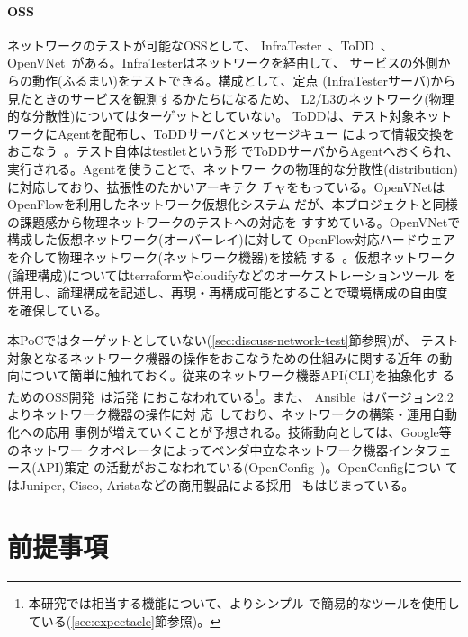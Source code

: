     \paragraph{OSS}
ネットワークのテストが可能なOSSとして、
InfraTester~\cite{infratester-github}、ToDD~\cite{todd-github}、
OpenVNet~\cite{openvnet-web}がある。InfraTesterはネットワークを経由して、
サービスの外側からの動作(ふるまい)をテストできる。構成として、定点
(InfraTesterサーバ)から見たときのサービスを観測するかたちになるため、
L2/L3のネットワーク(物理的な分散性)についてはターゲットとしていない。
ToDDは、テスト対象ネットワークにAgentを配布し、ToDDサーバとメッセージキュー
によって情報交換をおこなう~\cite{todd-blog}。テスト自体はtestletという形
でToDDサーバからAgentへおくられ、実行される。Agentを使うことで、ネットワー
クの物理的な分散性(distribution)に対応しており、拡張性のたかいアーキテク
チャをもっている。OpenVNetはOpenFlowを利用したネットワーク仮想化システム
だが、本プロジェクトと同様の課題感から物理ネットワークのテストへの対応を
すすめている。OpenVNetで構成した仮想ネットワーク(オーバーレイ)に対して
OpenFlow対応ハードウェアを介して物理ネットワーク(ネットワーク機器)を接続
する~\cite{openvnet-slide,network-testing-sdn-atmarkit}。仮想ネットワーク
(論理構成)についてはterraformやcloudifyなどのオーケストレーションツール
を併用し、論理構成を記述し、再現・再構成可能とすることで環境構成の自由度
を確保している。

本PoCではターゲットとしていない(\ref{sec:discuss-network-test}節参照)が、
テスト対象となるネットワーク機器の操作をおこなうための仕組みに関する近年
の動向について簡単に触れておく。従来のネットワーク機器API(CLI)を抽象化す
るためのOSS開発~\cite{netmiko-github,trigger-github,napalm-github}は活発
におこなわれている\footnote{本研究では相当する機能について、よりシンプル
で簡易的なツールを使用している(\ref{sec:expectacle}節参照)。}。また、
Ansible~\cite{ansible-web}はバージョン2.2よりネットワーク機器の操作に対
応~\cite{ansible-22-news}しており、ネットワークの構築・運用自動化への応用
事例が増えていくことが予想される。技術動向としては、Google等のネットワー
クオペレータによってベンダ中立なネットワーク機器インタフェース(API)策定
の活動がおこなわれている(OpenConfig~\cite{openconfig})。OpenConfigについ
てはJuniper, Cisco, Aristaなどの商用製品による採用~\cite{openconfig-news}
もはじまっている。

 \section{前提事項}
 \label{sec:premise}


